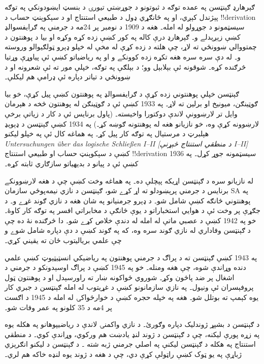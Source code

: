 \documentclass[../../../include/open-logic-section]{subfiles}
\begin{document}



ګېرهارډ ګېنټسن په عمده توګه د ثبوتونو د جوړښتي تيورۍ
د بنسټ ايښودونکي په توګه پېژندل کېږي، او په ځانګړي
ډول د طبيعي استنتاج او د سېکوېنټ حساب د
!!{derivation} سيسټمونو د جوړولو له امله۔ هغه د
1909 د نومبر پر 24مه د جرمني په ګرايفسوالډ کښې
زېږېدلے و۔ ګېرهارډ درې کاله په کور کښې زده کړه
وکړه او بيا د پوهنتون د چمتووالي ښوونځي ته لاړ،
چې هلته د زده کړې له مخې له خپلو ډېرو ټولګيوالو
وروسته و۔ له دې سره سره هغه تکړه زده کوونکے و
او په رياضياتو کښې ئې پياوړې وړتيا څرګنده کړه۔
شوقونه ئې بېلابېل وو؛ د بېلګې په توګه، خپلې مور
ته ئې شعرونه او د ښوونځي د تياتر دپاره ئې
ډرامې هم ليکلې۔

ګېنټسن خپلې پوهنتوني زده کړې د ګرايفسوالډ په
پوهنتون کښې پيل کړې، خو بيا ګوټينګن، ميونيخ او
برلين ته لاړ۔ په 1933 کښې ئې د ګوټينګن له
پوهنتون څخه د هېرمان وايل تر لارښوونې لاندې
دوکتورا واخيسته۔ (پاول برنايس ئې د کار د زياتې
برخې لارښوونه کړې وه، خو نازيانو هغه له پوهنتونه
ګوښه کړ۔) په 1934 کښې ګېنټسن د ډېوېډ هېلبرټ د
مرستيال په توګه کار پيل کړ۔ په هماغه کال ئې په
خپلو ليکنو \emph{Untersuchungen \"{u}ber das logische Schlie\ss en I--II
  [د منطقي استنتاج څېړنې I--II]} کښې د سېکوېنټ
حساب او طبيعي استنتاج !!{derivation} سيسټمونه
جوړ کړل۔ په 1936 کښې ئې د پيانو د بديهياتو
سازګاري ثابته کړه۔

له نازيانو سره د ګېنټسن اړيکه پېچلې ده۔ په
هماغه وخت کښې چې د هغه لارښوونکے برنايس د
جرمني پرېښودلو ته اړ کړے شو، ګېنټسن د نازي
نيمه‌پوځي سازمان SA په پوهنتوني څانګه کښې شامل
شو۔ د ډېرو جرمنيانو په شان هغه د نازي ګوند
غړے و۔ د جګړې پر وخت ئې د هوايي استخباراتو
د يوې څانګې د مخابراتي افسر په توګه کار کاوۀ۔
خو په 1942 کښې د عصبي ماتې له امله له دندې
خلاص کړے شو۔ دا څرګنده نۀ ده چې د ګېنټسن
وفاداري له نازي ګوند سره وه، که په ګوند کښې
د دې دپاره شامل شوے و چې علمي برياليتوب
ځان ته يقيني کړي۔

په 1943 کښې ګېنټسن ته د پراګ د جرمني پوهنتون
په رياضيکي انسټيټيوټ کښې علمي دنده وړاندې شوه،
چې هغه ومنله۔ خو په 1945 کښې د پراګ اوسېدونکو
د جرمني د اشغال پر ضد پاڅون وکړ۔ شوروي ځواکونه
ښار ته راورسېدل او د پوهنتون ټول پروفېسران ئې
ونيول۔ په نازي سازمانونو کښې د غړيتوب له امله
ګېنټسن د جبري کار يوه کېمپ ته بوتلل شو۔ هغه
په خپله حجره کښې د خوارځواکۍ له امله د 1945
د اګست پر 4مه د 35 کلونو په عمر وفات شو۔

\begin{reading}
د ګېنټسن د بشپړ ژوندليک دپاره
\citet{Menzler-Trott2007} وګورئ۔ د نازي واکمنۍ
لاندې د رياضيپوهانو په هکله يوه په زړه پورې
ليکنه، چې د ګېنټسن د ژوند لنډ يادښت هم ورکوي،
\citet{Segal2014} وړاندې کوي۔ د منطقي استنتاج
په هکله د ګېنټسن ليکنې په اصلي جرمني ژبه
شته \citep{Gentzen1935a,Gentzen1935b}۔ د ګېنټسن
د ليکنو انګرېزي ژباړې \citet{Gentzen1969} په
يو ټوک کښې راټولې کړې دي، چې د هغه د ژوند
يوه لنډه خاکه هم لري۔
\end{reading}
\end{document}
